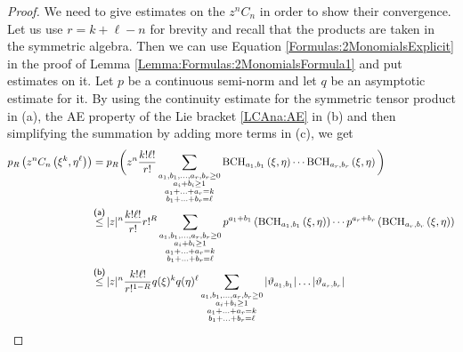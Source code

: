 \begin{proof}
    We need to give estimates on the $z^n C_n$ in order to show their
    convergence.  Let us use $r = k + \ell - n$ for brevity and recall
    that the products are taken in the symmetric algebra.
    Then we can use Equation \eqref{Formulas:2MonomialsExplicit} in the 
    proof of Lemma \ref{Lemma:Formulas:2MonomialsFormula1} and put 
    estimates on it. Let $p$ be a continuous semi-norm
    and let $q$ be an asymptotic estimate for it. By using the
    continuity estimate for the symmetric tensor product in (a), the
    AE property of the Lie bracket \eqref{LCAna:AE} in (b) and then 
    simplifying the summation by adding more terms in (c), we get
    \begin{align}
        \nonumber
        p_R \left(
            z^n C_n\left( \xi^k, \eta^{\ell} \right)
        \right)
        & =
        p_R \bigg(
        z^n
        \frac{k! \ell!}{r!}
        \sum\limits_{\substack{a_1, b_1, \ldots, a_r, b_r \geq 0 \\
            a_i + b_i \geq 1 \\
            a_1 + \ldots + a_r = k \\
            b_1 + \ldots + b_r = \ell
          }}
        \bchparts{a_1}{b_1}{\xi}{\eta}
        \cdots
        \bchparts{a_r}{b_r}{\xi}{\eta}
        \bigg)
        \\
        \nonumber
        & \ot{(a)}{\leq}
        |z|^n
        \frac{k! \ell!}{r!}
        r!^R
        \sum\limits_{\substack{a_1, b_1, \ldots, a_r, b_r \geq 0 \\
            a_i + b_i \geq 1 \\
            a_1 + \ldots + a_r = k \\
            b_1 + \ldots + b_r = \ell
          }}
        p^{a_1 + b_1} \left( \bchparts{a_1}{b_1}{\xi}{\eta} \right)
        \cdots
        p^{a_r + b_r} \left( \bchparts{a_r}{b_r}{\xi}{\eta} \right)
        \\
        \nonumber
        & \ot{(b)}{\leq}
        |z|^n
        \frac{k! \ell!}{r!^{1-R}}
        q(\xi)^k q(\eta)^{\ell}
        \sum\limits_{\substack{a_1, b_1, \ldots, a_r, b_r \geq 0 \\
            a_i + b_i \geq 1 \\
            a_1 + \ldots + a_r = k \\
            b_1 + \ldots + b_r = \ell
          }}
        |\vartheta_{a_1, b_1}| \ldots |\vartheta_{a_r, b_r}|
        \\
        \label{LCAna:2MonomialsPreEstimate}

\end{align}
\end{proof}
